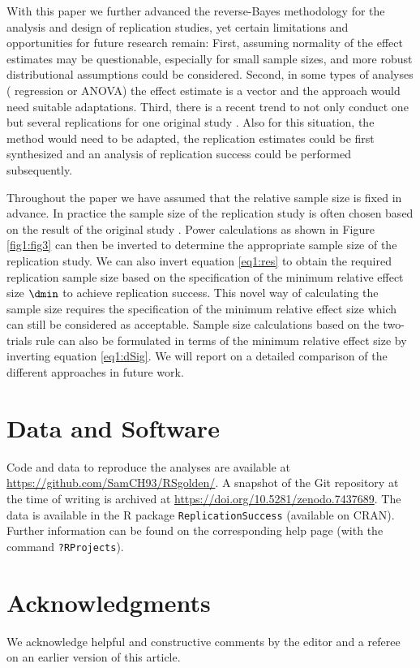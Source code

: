 With this paper we further advanced the reverse-Bayes methodology for the
analysis and design of replication studies, yet certain limitations and
opportunities for future research remain: First, assuming normality of the
effect estimates may be questionable, especially for small sample sizes, and
more robust distributional assumptions could be considered. Second, in some
types of analyses (\eg{} regression or ANOVA) the effect estimate is a vector and
the approach would need suitable adaptations. Third, there is a recent trend to
not only conduct one but several replications for one original study
\citep[\eg{}][]{Klein2014, Ebersole2016, Klein2018}. Also for this situation, the
method would need to be adapted, \eg{} the replication estimates could be first
synthesized and an analysis of replication success could be performed
subsequently.


Throughout the paper we have assumed that the relative sample size is fixed in
advance. In practice the sample size of the replication study is often chosen
based on the result of the original study \citep{Anderson2017}. Power
calculations as shown in Figure \ref{fig1:fig3} can then be inverted to determine
the appropriate sample size of the replication study. We can also invert
equation \eqref{eq1:res} to obtain the required replication sample size based on
the specification of the minimum relative effect size $\dmin$ to achieve
replication success. This novel way of calculating the sample size requires the
specification of the minimum relative effect size which can still be considered
as acceptable. Sample size calculations based on the two-trials rule can also be
formulated in terms of the minimum relative effect size by inverting equation
\eqref{eq1:dSig}. We will report on a detailed comparison of the different
approaches in future work.



\section*{Data and Software}
Code and data to reproduce the analyses are available at
\url{https://github.com/SamCH93/RSgolden/}. A snapshot of the Git repository at
the time of writing is archived at \url{https://doi.org/10.5281/zenodo.7437689}.
The data is available in the R package \texttt{ReplicationSuccess} (available on
CRAN). Further information can be found on the corresponding help page (with the
command \texttt{?RProjects}).

\section*{Acknowledgments}
We acknowledge helpful and constructive comments by the editor and a referee on
an earlier version of this article.




